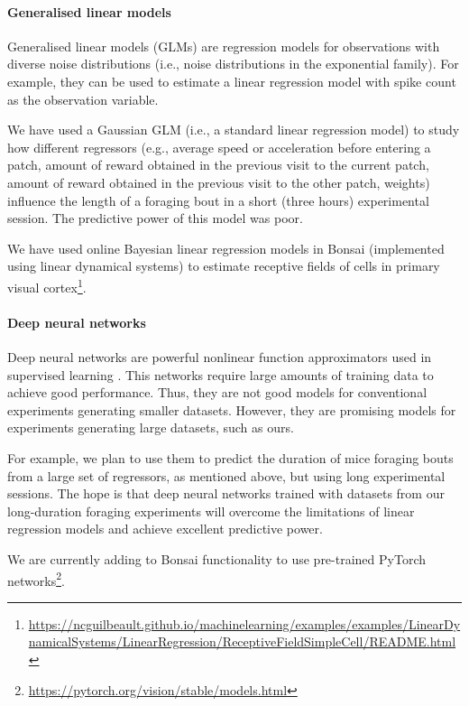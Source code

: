 \paragraph{Generalised linear models}

Generalised linear models (GLMs) are regression models for observations with diverse
noise distributions (i.e., noise distributions in the exponential family). For
example, they can be used to estimate a linear regression model with spike
count as the observation variable.

We have used a Gaussian GLM (i.e., a standard linear regression model) to
study how different regressors (e.g., average speed or acceleration
before entering a patch, amount of reward obtained in the previous visit to the
current patch, amount of reward obtained in the previous visit to the other
patch, weights) influence the length of a foraging bout in a short (three
hours) experimental session. The predictive power of this model was poor.

We have used online Bayesian linear regression models in Bonsai (implemented
using linear dynamical systems) to estimate
receptive fields of cells in primary visual
cortex\footnote{\url{https://ncguilbeault.github.io/machinelearning/examples/examples/LinearDynamicalSystems/LinearRegression/ReceptiveFieldSimpleCell/README.html}}.

\paragraph{Deep neural networks}

Deep neural networks are powerful nonlinear function approximators used in
supervised learning \citep{goodfellowEtAl16}. This networks require large
amounts of training data to achieve good performance. Thus, they are not good
models for conventional experiments generating smaller datasets. However, they
are promising models for experiments generating large datasets, such as ours.

For example, we plan to use them to predict the duration of mice foraging bouts from a
large set of regressors, as mentioned above, but using long experimental
sessions. The hope is that deep neural networks trained with datasets
from our long-duration foraging experiments will overcome the limitations of
linear regression models and achieve excellent predictive power.

We are currently adding to Bonsai functionality to use pre-trained PyTorch
networks\footnote{\url{https://pytorch.org/vision/stable/models.html}}.

